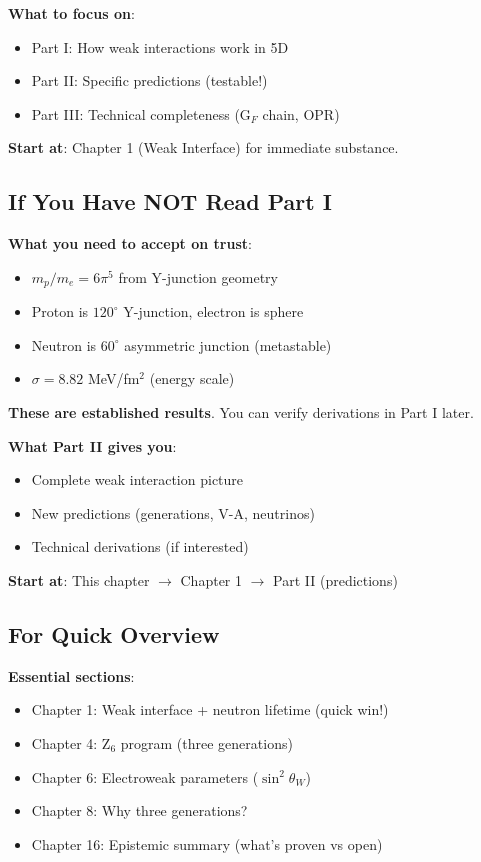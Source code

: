 \textbf{What to focus on}:
\begin{itemize}
\item Part I: How weak interactions work in 5D
\item Part II: Specific predictions (testable!)
\item Part III: Technical completeness (G$_F$ chain, OPR)
\end{itemize}

\textbf{Start at}: Chapter 1 (Weak Interface) for immediate substance.

\subsection{If You Have NOT Read Part I}

\textbf{What you need to accept on trust}:
\begin{itemize}
\item $m_p/m_e = 6\pi^5$ \tagDer{} from Y-junction geometry
\item Proton is $120^\circ$ Y-junction, electron is sphere
\item Neutron is $60^\circ$ asymmetric junction (metastable)
\item $\sigma = 8.82$ MeV/fm$^2$ \tagDc{} (energy scale)
\end{itemize}

\textbf{These are established results}. You can verify derivations in Part I later.

\textbf{What Part II gives you}:
\begin{itemize}
\item Complete weak interaction picture
\item New predictions (generations, V-A, neutrinos)
\item Technical derivations (if interested)
\end{itemize}

\textbf{Start at}: This chapter $\to$ Chapter 1 $\to$ Part II (predictions)

\subsection{For Quick Overview}

\textbf{Essential sections}:
\begin{itemize}
\item Chapter 1: Weak interface + neutron lifetime (quick win!)
\item Chapter 4: Z$_6$ program (three generations)
\item Chapter 6: Electroweak parameters ($\sin^2\theta_W$)
\item Chapter 8: Why three generations?
\item Chapter 16: Epistemic summary (what's proven vs open)
\end{itemize}

